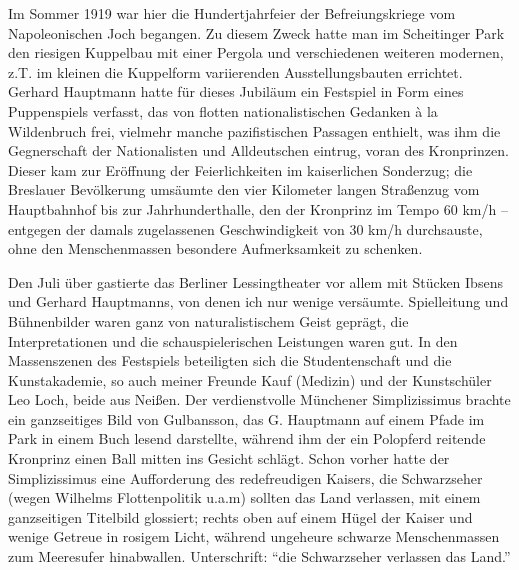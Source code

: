 \documentclass[a5paper,pagesize,10pt,twoside=true]{scrbook}
\renewcommand{\marginpar}[2][]{}
\begin{document}
Im Sommer 1919 war hier die Hundertjahrfeier der Befreiungskriege vom Napoleonischen Joch begangen. Zu diesem Zweck hatte man im Scheitinger Park den riesigen Kuppelbau mit einer Pergola und verschiedenen weiteren modernen, z.T. im kleinen die Kuppelform variierenden Ausstellungsbauten errichtet. Gerhard Hauptmann hatte für dieses Jubiläum ein Festspiel in Form eines Puppenspiels verfasst, das von flotten nationalistischen Gedanken à la Wildenbruch frei, vielmehr manche pazifistischen Passagen enthielt, was ihm die Gegnerschaft der Nationalisten und Alldeutschen eintrug, voran des Kronprinzen. Dieser kam zur Eröffnung der Feierlichkeiten im kaiserlichen Sonderzug; die Breslauer Bevölkerung umsäumte den vier Kilometer langen Straßenzug vom Hauptbahnhof bis zur Jahrhunderthalle, den der Kronprinz im Tempo 60 km/h -- entgegen der damals zugelassenen Geschwindigkeit von 30 km/h durchsauste, ohne den Menschenmassen besondere Aufmerksamkeit zu schenken.

\marginpar{150}
Den Juli über gastierte das Berliner Lessingtheater vor allem mit Stücken Ibsens und Gerhard Hauptmanns, von denen ich nur wenige versäumte. Spielleitung und Bühnenbilder waren ganz von naturalistischem Geist geprägt, die Interpretationen und die schauspielerischen Leistungen waren gut. In den Massenszenen des Festspiels beteiligten sich die Studentenschaft und die Kunstakademie, so auch meiner Freunde Kauf (Medizin) und der Kunstschüler Leo Loch, beide aus Neißen. Der verdienstvolle Münchener Simplizissimus brachte ein ganzseitiges Bild von Gulbansson, das G. Hauptmann auf einem Pfade im Park in einem Buch lesend darstellte, während ihm der ein Polopferd reitende Kronprinz einen Ball mitten ins Gesicht schlägt. Schon vorher hatte der Simplizissimus eine Aufforderung des redefreudigen Kaisers, die Schwarzseher (wegen Wilhelms Flottenpolitik u.a.m) sollten das Land verlassen, mit einem ganzseitigen Titelbild glossiert; rechts oben auf einem Hügel der Kaiser und wenige Getreue in rosigem Licht, während ungeheure schwarze Menschenmassen zum Meeresufer hinabwallen. Unterschrift: \enquote{die Schwarzseher verlassen das Land.}
\end{document}
